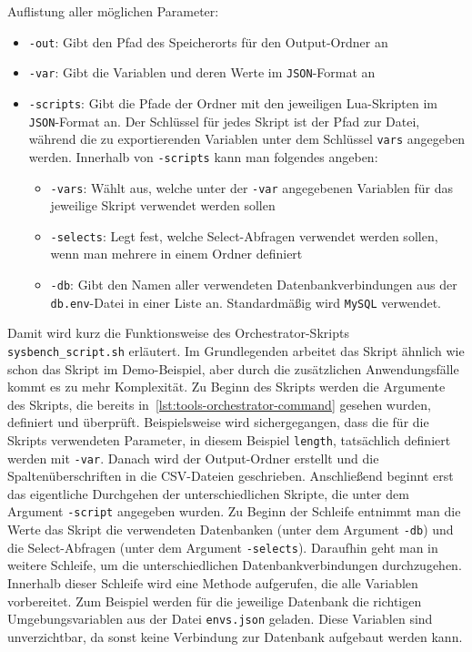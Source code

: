 Auflistung aller möglichen Parameter:
\begin{itemize}
    \setlength{\itemsep}{-5pt}
    \item \texttt{-out}: Gibt den Pfad des Speicherorts für den Output-Ordner an
    \item \texttt{-var}: Gibt die Variablen und deren Werte im \texttt{JSON}-Format an
    \item \texttt{-scripts}: Gibt die Pfade der Ordner mit den jeweiligen Lua-Skripten im \texttt{JSON}-Format an.
    Der Schlüssel für jedes Skript ist der Pfad zur Datei, während die zu exportierenden Variablen unter dem Schlüssel \texttt{vars} angegeben werden.
    \newline Innerhalb von \texttt{-scripts} kann man folgendes angeben:
    \begin{itemize}
        \setlength{\itemsep}{-5pt}
        \item \texttt{-vars}: Wählt aus, welche unter der \texttt{-var} angegebenen Variablen für das jeweilige Skript verwendet werden sollen
        \item \texttt{-selects}: Legt fest, welche Select-Abfragen verwendet werden sollen, wenn man mehrere in einem Ordner definiert
        \item \texttt{-db}: Gibt den Namen aller verwendeten Datenbankverbindungen aus der \texttt{db.env}-Datei in einer Liste an.
        Standardmäßig wird \texttt{MySQL} verwendet.
    \end{itemize}
\end{itemize}

Damit wird kurz die Funktionsweise des Orchestrator-Skripts \texttt{sysbench\_script.sh} erläutert.
Im Grundlegenden arbeitet das Skript ähnlich wie schon das Skript im Demo-Beispiel, aber durch die zusätzlichen Anwendungsfälle kommt es zu mehr Komplexität.
Zu Beginn des Skripts werden die Argumente des Skripts, die bereits in~\ref{lst:tools-orchestrator-command} gesehen wurden, definiert und überprüft.
Beispielsweise wird sichergegangen, dass die für die Skripts verwendeten Parameter, in diesem Beispiel \texttt{length}, tatsächlich definiert werden mit \texttt{-var}.
Danach wird der Output-Ordner erstellt und die Spaltenüberschriften in die CSV-Dateien geschrieben.
Anschließend beginnt erst das eigentliche Durchgehen der unterschiedlichen Skripte, die unter dem Argument \texttt{-script} angegeben wurden.
Zu Beginn der Schleife entnimmt man die Werte das Skript die verwendeten Datenbanken (unter dem Argument \texttt{-db}) und die Select-Abfragen (unter dem Argument \texttt{-selects}).
Daraufhin geht man in weitere Schleife, um die unterschiedlichen Datenbankverbindungen durchzugehen.
Innerhalb dieser Schleife wird eine Methode aufgerufen, die alle Variablen vorbereitet.
Zum Beispiel werden für die jeweilige Datenbank die richtigen Umgebungsvariablen aus der Datei \texttt{envs.json} geladen.
Diese Variablen sind unverzichtbar, da sonst keine Verbindung zur Datenbank aufgebaut werden kann.


